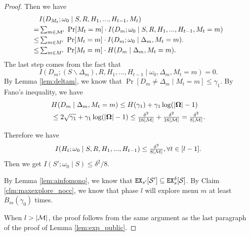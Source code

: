 \begin{proof}
Then we have
\begin{align*}
& I(D_{M_t}; \omega_0 \mid S,R,H_1,...,H_{t-1},M_t)\\
=& \textstyle   \sum_{m \in \mathcal{M}'}\; \Pr[M_t = m] \cdot I(D_m;\omega_0  \mid  S,R,H_1,...,H_{t-1},M_t = m)\\
\leq& \textstyle  \sum_{m \in M'}\; \Pr[M_t = m] \cdot I(D_m;\omega_0 \mid  \Delta_m, M_t =m).\\
\leq& \textstyle  \sum_{m \in M'}\; \Pr[M_t = m] \cdot H(D_m \mid  \Delta_m, M_t =m).
\end{align*}
The last step comes from the fact that
\[ I(D_m; (S\backslash \Delta_m),R,H_1,...,H_{t-1} \mid \omega_0, \Delta_m, M_t =m) = 0.\]
By Lemma \ref{lem:deltam}, we know that $\Pr[D_m \neq \Delta_m \mid M_t = m] \leq \gamma_1$. By Fano's inequality, we have
\begin{align*}
&H(D_m \mid  \Delta_m, M_t =m) \leq H(\gamma_1) + \gamma_1 \log(|\bold{\Omega}| - 1) \\
&\leq 2\sqrt{\gamma_1} + \gamma_1 \log(|\bold{\Omega}| - 1) \leq \tfrac{\delta^2}{16|\mathcal{M}|}+\tfrac{\delta^2}{16|\mathcal{M}|}  = \tfrac{\delta^2}{8|\mathcal{M}|}.
\end{align*}

Therefore we have
\[
I(H_t; \omega_0 \mid S,R,H_1,...,H_{t-1}) \leq \tfrac{\delta^2}{8|\mathcal{M}|}, \forall t \in [l-1].
\]
Then we get
    $ I(S'; \omega_0 \mid S) \leq \delta^2/8$.

By Lemma \ref{lem:ainfomono}, we know that $\mathtt{EX}_{s'}[\mathcal{S}'] \subseteq \mathtt{EX}^{\delta}_s[\mathcal{S}]$. By Claim \ref{clm:maxexplore_nocc}, we know that phase $l$ will explore menu $m$ at least $B_m(\gamma_0)$ times.

When $l > |\mathcal{M}|$, the proof follows from the same argument as the last paragraph of the proof of Lemma \ref{lem:exp_public}.
\end{proof}


